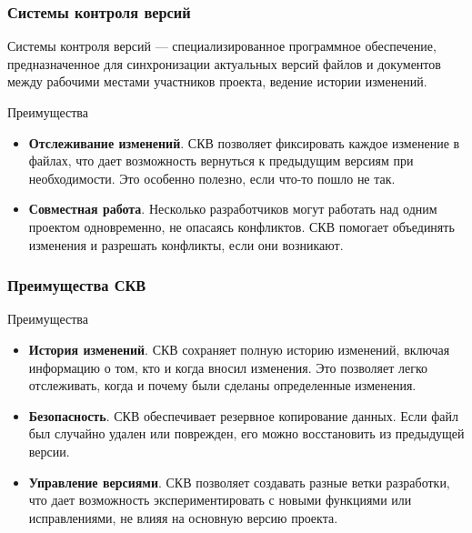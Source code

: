 \documentclass[aspectratio=169]{beamer}
\begin{document}
\begin{frame}
\frametitle{Системы контроля версий}
Системы контроля версий --- специализированное программное обеспечение, предназначенное для синхронизации актуальных версий файлов и документов между рабочими местами участников проекта, ведение истории изменений.
\begin{exampleblock}{Преимущества}
\begin{itemize}
\item \textbf{Отслеживание изменений}. СКВ позволяет фиксировать каждое изменение в файлах, что дает возможность вернуться к предыдущим версиям при необходимости. Это особенно полезно, если что-то пошло не так.
\item \textbf{Совместная работа}. Несколько разработчиков могут работать над одним проектом одновременно, не опасаясь конфликтов. СКВ помогает объединять изменения и разрешать конфликты, если они возникают.
\end{itemize}
\end{exampleblock}
\end{frame}

\begin{frame}
\frametitle{Преимущества СКВ}
\begin{exampleblock}{Преимущества}
\begin{itemize}
\item \textbf{История изменений}. СКВ сохраняет полную историю изменений, включая информацию о том, кто и когда вносил изменения. Это позволяет легко отслеживать, когда и почему были сделаны определенные изменения.
\item \textbf{Безопасность}. СКВ обеспечивает резервное копирование данных. Если файл был случайно удален или поврежден, его можно восстановить из предыдущей версии.
\item \textbf{Управление версиями}. СКВ позволяет создавать разные ветки разработки, что дает возможность экспериментировать с новыми функциями или исправлениями, не влияя на основную версию проекта.
\end{itemize}
\end{exampleblock}
\end{frame}
\end{document}
